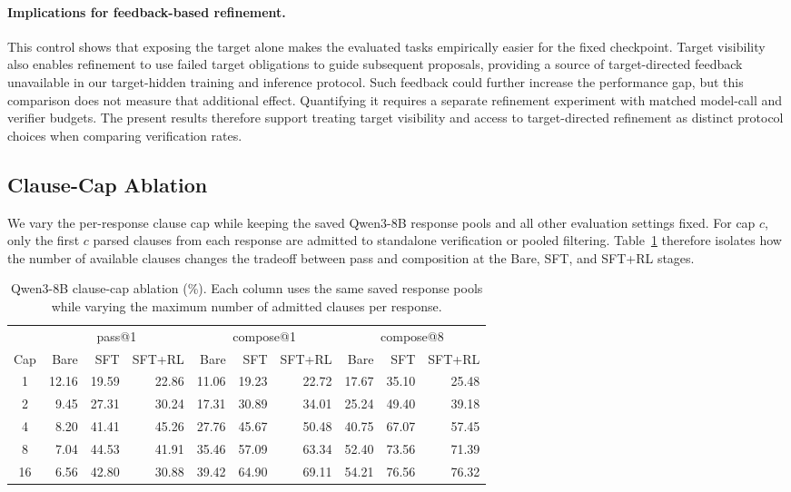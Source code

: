 \paragraph{Implications for feedback-based refinement.}
This control shows that exposing the target alone makes the evaluated tasks
empirically easier for the fixed checkpoint.  Target visibility also enables
refinement to use failed target obligations to guide subsequent proposals,
providing a source of target-directed feedback unavailable in our target-hidden
training and inference protocol.  Such feedback could further increase the
performance gap, but this comparison does not measure that additional effect.
Quantifying it requires a separate refinement experiment with matched model-call
and verifier budgets.  The present results therefore support treating target
visibility and access to target-directed refinement as distinct protocol
choices when comparing verification rates.

\subsection{Clause-Cap Ablation}
\label{app:clause-cap}

We vary the per-response clause cap while keeping the saved Qwen3-8B response
pools and all other evaluation settings fixed.  For cap \(c\), only the first
\(c\) parsed clauses from each response are admitted to standalone verification
or pooled filtering.  Table~\ref{tab:clause-cap-ablation} therefore isolates
how the number of available clauses changes the tradeoff between pass and
composition at the Bare, SFT, and SFT+RL stages.

\begin{table}[H]
\centering
\small
\setlength{\tabcolsep}{3.2pt}
\caption{Qwen3-8B clause-cap ablation (\%).  Each column uses the same saved
  response pools while varying the maximum number of admitted clauses per
  response.}
\label{tab:clause-cap-ablation}
\begin{tabular}{crrrrrrrrr}
\toprule
\rowcolor{algobg}
& \multicolumn{3}{c}{pass@1} & \multicolumn{3}{c}{compose@1}
& \multicolumn{3}{c}{compose@8} \\
\headercmidrules{\cmidrule(lr){2-4}\cmidrule(lr){5-7}\cmidrule(lr){8-10}}
\rowcolor{algobg}
Cap & Bare & SFT & SFT+RL & Bare & SFT & SFT+RL
& Bare & SFT & SFT+RL \\
\midrule
1  & 12.16 & 19.59 & 22.86 & 11.06 & 19.23 & 22.72 & 17.67 & 35.10 & 25.48 \\
2  &  9.45 & 27.31 & 30.24 & 17.31 & 30.89 & 34.01 & 25.24 & 49.40 & 39.18 \\
4  &  8.20 & 41.41 & 45.26 & 27.76 & 45.67 & 50.48 & 40.75 & 67.07 & 57.45 \\
8  &  7.04 & 44.53 & 41.91 & 35.46 & 57.09 & 63.34 & 52.40 & 73.56 & 71.39 \\
16 &  6.56 & 42.80 & 30.88 & 39.42 & 64.90 & 69.11 & 54.21 & 76.56 & 76.32 \\
\bottomrule
\end{tabular}
\end{table}

